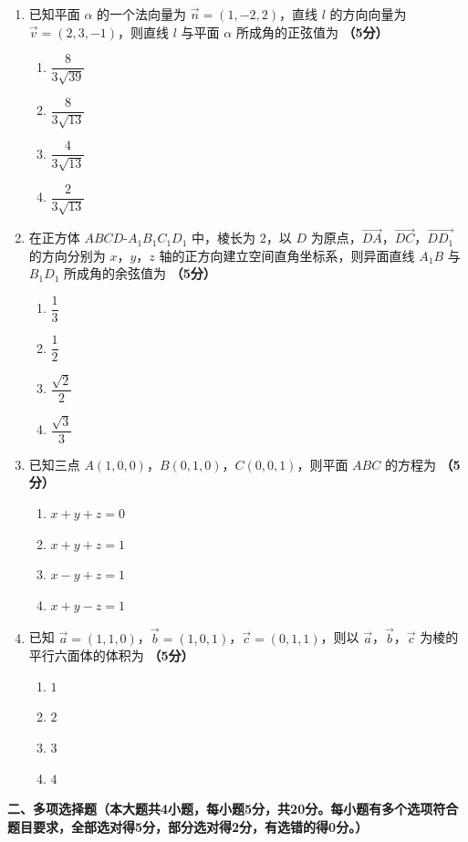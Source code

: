 \documentclass[12pt, a4paper]{ctexart}
\newcommand{\score}[1]{\hfill\textbf{（#1分）}}
\begin{document}
\begin{enumerate}
\item 已知平面 $\alpha$ 的一个法向量为 $\vec{n}=(1,-2,2)$，直线 $l$ 的方向向量为 $\vec{v}=(2,3,-1)$，则直线 $l$ 与平面 $\alpha$ 所成角的正弦值为 \score{5}
\begin{enumerate}[label=\Alph*.]
\item $\dfrac{8}{3\sqrt{39}}$
\item $\dfrac{8}{3\sqrt{13}}$
\item $\dfrac{4}{3\sqrt{13}}$
\item $\dfrac{2}{3\sqrt{13}}$
\end{enumerate}

\item 在正方体 $ABCD\text{-}A_1B_1C_1D_1$ 中，棱长为 $2$，以 $D$ 为原点，$\overrightarrow{DA}$，$\overrightarrow{DC}$，$\overrightarrow{DD_1}$ 的方向分别为 $x$，$y$，$z$ 轴的正方向建立空间直角坐标系，则异面直线 $A_1B$ 与 $B_1D_1$ 所成角的余弦值为 \score{5}
\begin{enumerate}[label=\Alph*.]
\item $\dfrac{1}{3}$
\item $\dfrac{1}{2}$
\item $\dfrac{\sqrt{2}}{2}$
\item $\dfrac{\sqrt{3}}{3}$
\end{enumerate}

\item 已知三点 $A(1,0,0)$，$B(0,1,0)$，$C(0,0,1)$，则平面 $ABC$ 的方程为 \score{5}
\begin{enumerate}[label=\Alph*.]
\item $x+y+z=0$
\item $x+y+z=1$
\item $x-y+z=1$
\item $x+y-z=1$
\end{enumerate}

\item 已知 $\vec{a}=(1,1,0)$，$\vec{b}=(1,0,1)$，$\vec{c}=(0,1,1)$，则以 $\vec{a}$，$\vec{b}$，$\vec{c}$ 为棱的平行六面体的体积为 \score{5}
\begin{enumerate}[label=\Alph*.]
\item $1$
\item $2$
\item $3$
\item $4$
\end{enumerate}
\end{enumerate}

\vspace{1em}

\noindent\textbf{二、多项选择题（本大题共4小题，每小题5分，共20分。每小题有多个选项符合题目要求，全部选对得5分，部分选对得2分，有选错的得0分。）}
\end{document}
